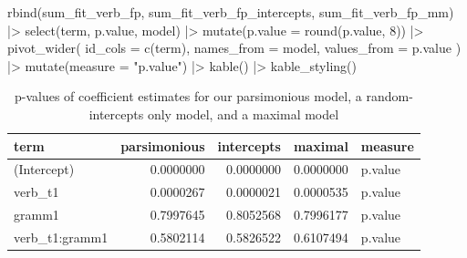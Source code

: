 \documentclass[
  letterpaper,
  DIV=11,
  numbers=noendperiod]{scrartcl}
\newenvironment{Shaded}{\begin{snugshade}}{\end{snugshade}}
\newcommand{\AttributeTok}[1]{\textcolor[rgb]{0.40,0.45,0.13}{#1}}
\newcommand{\DecValTok}[1]{\textcolor[rgb]{0.68,0.00,0.00}{#1}}
\newcommand{\FunctionTok}[1]{\textcolor[rgb]{0.28,0.35,0.67}{#1}}
\newcommand{\NormalTok}[1]{\textcolor[rgb]{0.00,0.23,0.31}{#1}}
\newcommand{\SpecialCharTok}[1]{\textcolor[rgb]{0.37,0.37,0.37}{#1}}
\newcommand{\StringTok}[1]{\textcolor[rgb]{0.13,0.47,0.30}{#1}}
\begin{document}
\begin{Shaded}
\begin{Highlighting}[]
\FunctionTok{rbind}\NormalTok{(sum\_fit\_verb\_fp, sum\_fit\_verb\_fp\_intercepts, sum\_fit\_verb\_fp\_mm) }\SpecialCharTok{|\textgreater{}} 
  \FunctionTok{select}\NormalTok{(term, p.value, model) }\SpecialCharTok{|\textgreater{}}
  \FunctionTok{mutate}\NormalTok{(}\AttributeTok{p.value =} \FunctionTok{round}\NormalTok{(p.value, }\DecValTok{8}\NormalTok{)) }\SpecialCharTok{|\textgreater{}} 
  \FunctionTok{pivot\_wider}\NormalTok{(}
    \AttributeTok{id\_cols =} \FunctionTok{c}\NormalTok{(term),}
    \AttributeTok{names\_from =}\NormalTok{ model,}
    \AttributeTok{values\_from =}\NormalTok{ p.value}
\NormalTok{  ) }\SpecialCharTok{|\textgreater{}} 
  \FunctionTok{mutate}\NormalTok{(}\AttributeTok{measure =} \StringTok{"p.value"}\NormalTok{) }\SpecialCharTok{|\textgreater{}} 
  \FunctionTok{kable}\NormalTok{() }\SpecialCharTok{|\textgreater{}} 
  \FunctionTok{kable\_styling}\NormalTok{()}
\end{Highlighting}
\end{Shaded}

\hypertarget{tbl-p_value}{}
\begin{longtable}[t]{lrrrl}
\caption{\label{tbl-p_value}p-values of coefficient estimates for our parsimonious model, a
random-intercepts only model, and a maximal model }\tabularnewline

\toprule
term & parsimonious & intercepts & maximal & measure\\
\midrule
(Intercept) & 0.0000000 & 0.0000000 & 0.0000000 & p.value\\
verb\_t1 & 0.0000267 & 0.0000021 & 0.0000535 & p.value\\
gramm1 & 0.7997645 & 0.8052568 & 0.7996177 & p.value\\
verb\_t1:gramm1 & 0.5802114 & 0.5826522 & 0.6107494 & p.value\\
\bottomrule
\end{longtable}
\end{document}
